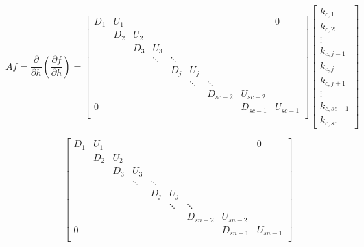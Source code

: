 \documentclass[11pt]{article}
\begin{document}
\[
Af =
\frac{\partial}{\partial h} \left( \frac{\partial f}{\partial h} \right)
=
\left[
\begin{array}{ccccccccc}
D_{1} & U_{1} &  &   &   &   &   &   & 0 \\
  & D_{2} & U_{2} &   &   &   &   &   &   \\
  &   & D_{3} & U_{3} &   &   &   &   &   \\
  &   &  & \ddots & \ddots &   &   &   &   \\
  &   &   &   & D_{j} & U_{j} &   &   &   \\
  &   &   &   &  & \ddots & \ddots &   &   \\
  &   &   &   &   &   & D_{sc-2} & U_{sc-2} &   \\
 0 &   &   &   &   &   &   & D_{sc-1} & U_{sc-1} \\
\end{array}
\right]
\left[ \begin{array}{c}
k_{c,1} \\ k_{c,2} \\ \vdots \\ k_{c,j-1} \\ k_{c,j} \\ k_{c,j+1} \\ \vdots \\ k_{c,sc-1} \\ k_{c,sc}
\end{array} \right]
\]

\[
\left[
\begin{array}{ccccccccc}
D_{1} & U_{1} &  &   &   &   &   &   & 0 \\
  & D_{2} & U_{2} &   &   &   &   &   &   \\
  &   & D_{3} & U_{3} &   &   &   &   &   \\
  &   &  & \ddots & \ddots &   &   &   &   \\
  &   &   &   & D_{j} & U_{j} &   &   &   \\
  &   &   &   &  & \ddots & \ddots &   &   \\
  &   &   &   &   &   & D_{sn-2} & U_{sn-2} &   \\
 0 &   &   &   &   &   &   & D_{sn-1} & U_{sn-1} \\
\end{array}
\right]
\]
\end{document}
